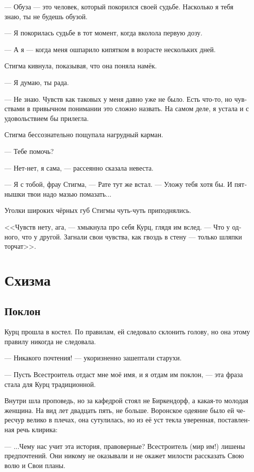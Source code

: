 \documentclass[a4paper,12pt,fleqn]{book}\usepackage{polyglossia}\setdefaultlanguage[babelshorthands=true]{russian}\setotherlanguage{english}\defaultfontfeatures{Ligatures=TeX,Mapping=tex-text}\usepackage{xcolor}\newcommand{\ml}[3]{#2}
\begin{document}
--- Обуза --- это человек, который покорился своей судьбе.
Насколько я тебя знаю, ты не будешь обузой.

--- Я покорилась судьбе в тот момент, когда вколола первую дозу.

--- А я --- когда меня ошпарило кипятком в возрасте нескольких дней.

Стигма кивнула, показывая, что она поняла намёк.

--- Я думаю, ты рада.

--- Не знаю.
Чувств как таковых у меня давно уже не было.
Есть что-то, но чувствами в привычном понимании это сложно назвать.
На самом деле, я устала и с удовольствием бы прилегла.

Стигма бессознательно пощупала нагрудный карман.

--- Тебе помочь?

--- Нет-нет, я сама, --- рассеянно сказала невеста.

--- Я с тобой, фрау Стигма, --- Рате тут же встал.
--- Уложу тебя хотя бы.
И пятнышки твои надо мазью помазать...

Уголки широких чёрных губ Стигмы чуть-чуть приподнялись.

<<Чувств нету, ага, --- хмыкнула про себя Курц, глядя им вслед.
--- Что у одного, что у другой.
Загнали свои чувства, как гвоздь в стену --- только шляпки торчат>>.

\chapter{Схизма}

\section{Поклон}

Курц прошла в костел.
По правилам, ей следовало склонить голову, но она этому правилу никогда не следовала.

--- Никакого почтения! --- укоризненно зашептали старухи.

--- Пусть Всестроитель отдаст мне моё имя, и я отдам им поклон, --- эта фраза стала для Курц традиционной.

Внутри шла проповедь, но за кафедрой стоял не Биркендорф, а какая-то молодая женщина.
На вид лет двадцать пять, не больше.
Воронское одеяние было ей чересчур велико в плечах, она сутулилась, но из её уст текла уверенная, поставленная речь клирика:

--- ...Чему нас учит эта история, правоверные?
Всестроитель (мир им!) лишены предпочтений.
Они никому не оказывали и не окажет милости рассказать Свою волю и Свои планы.
\end{document}
